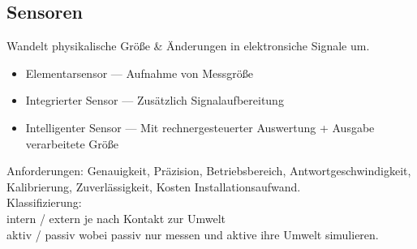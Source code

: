 \subsection{Sensoren}%
\label{ts:sub:sensoren}
Wandelt physikalische Größe \& Änderungen in elektronsiche Signale um.
\begin{itemize}
\item Elementarsensor --- Aufnahme von Messgröße
\item Integrierter Sensor --- Zusätzlich Signalaufbereitung
\item Intelligenter Sensor --- Mit rechnergesteuerter Auswertung + Ausgabe verarbeitete Größe
\end{itemize}

Anforderungen: Genauigkeit, Präzision, Betriebsbereich, Antwortgeschwindigkeit, Kalibrierung, Zuverlässigkeit, Kosten
Installationsaufwand.\\

Klassifizierung:\\
intern / extern je nach Kontakt zur Umwelt\\
aktiv / passiv wobei passiv nur messen und aktive ihre Umwelt simulieren.
